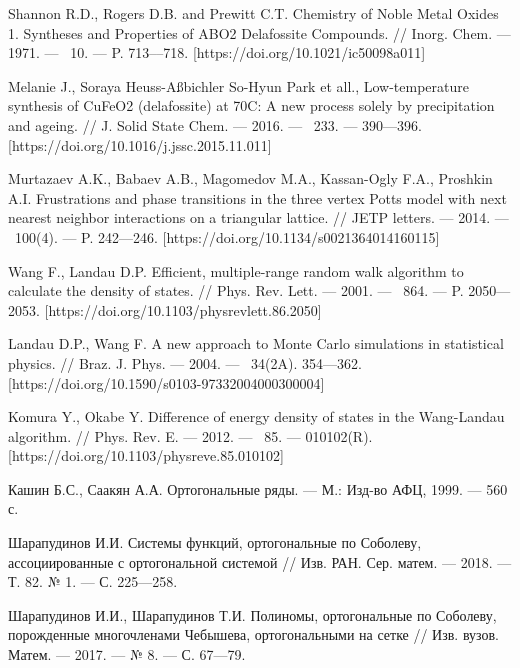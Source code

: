 \begin{thebibliography}{111}
Shannon R.D., Rogers D.B. and Prewitt C.T. Chemistry of Noble Metal Oxides 1. Syntheses and Properties of ABO2 Delafossite Compounds. // Inorg. Chem. --- 1971. --- \No\ 10. --- P. 713--–718. [https://doi.org/10.1021/ic50098a011]

Melanie J., Soraya Heuss-Aßbichler So-Hyun Park et all., Low-temperature synthesis of CuFeO2 (delafossite) at 70C: A new process solely by precipitation and ageing. // J. Solid State Chem. --- 2016. --- \No\ 233. --- 390---396. [https://doi.org/10.1016/j.jssc.2015.11.011]

Murtazaev A.K., Babaev A.B., Magomedov M.A., Kassan-Ogly F.A., Proshkin A.I. Frustrations and phase transitions in the three vertex Potts model with next nearest neighbor interactions on a triangular lattice. // JETP letters. --- 2014. --- \No\ 100(4). --- P. 242---246. [https://doi.org/10.1134/s0021364014160115]

Wang F., Landau D.P. Efficient, multiple-range random walk algorithm to calculate the density of states. // Phys. Rev. Lett. --- 2001. --- \No\ 864. --- P. 2050---2053. [https://doi.org/10.1103/physrevlett.86.2050]

Landau D.P., Wang F. A new approach to Monte Carlo simulations in statistical physics. // Braz. J. Phys. --- 2004. --- \No\ 34(2A). 354---362. [https://doi.org/10.1590/s0103-97332004000300004]

Komura Y., Okabe Y. Difference of energy density of states in the Wang-Landau algorithm. // Phys. Rev. E. --- 2012. --- \No\ 85. --- 010102(R). [https://doi.org/10.1103/physreve.85.010102]








Кашин Б.С., Саакян А.А. Ортогональные ряды. --- М.: Изд-во АФЦ, 1999. --- 560 с.

Шарапудинов И.И. Системы функций, ортогональные по Соболеву, ассоциированные с ортогональной системой // Изв. РАН. Сер. матем. --- 2018. --- Т. 82. № 1. --- С. 225---258.

Шарапудинов И.И., Шарапудинов Т.И. Полиномы, ортогональные по Соболеву, порожденные многочленами Чебышева, ортогональными на сетке // Изв. вузов. Матем. --- 2017. --- № 8. --- С. 67---79.


\end{thebibliography}
